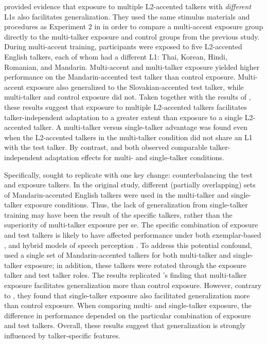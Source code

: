 \documentclass[preprint, 3p, authoryear]{elsarticle} %
\begin{document}
\citet{baese2013} provided evidence that exposure to multiple L2-accented talkers with \emph{different} L1s also facilitates generalization.
They used the same stimulus materials and procedures as Experiment 2 in \citet{bradlow2008} in order to compare a multi-accent exposure group directly to the multi-talker exposure and control groups from the previous study.
During multi-accent training, participants were exposed to five L2-accented English talkers, each of whom had a different L1: Thai, Korean, Hindi, Romanian, and Mandarin.
Multi-accent and multi-talker exposure yielded higher performance on the Mandarin-accented test talker than control exposure.
Multi-accent exposure also generalized to the Slovakian-accented test talker, while multi-talker and control exposure did not.
Taken together with the results of \citet{bradlow2008}, these results suggest that exposure to multiple L2-accented talkers facilitates talker-independent adaptation to a greater extent than exposure to a single L2-accented talker.
A multi-talker versus single-talker advantage was found even when the L2-accented talkers in the multi-talker condition did not share an L1 with the test talker.
By contrast, \citet{xie2021} and \citet{xie2017similarity} both observed comparable talker-independent adaptation effects for multi- and single-talker conditions.

Specifically, \citet{xie2021} sought to replicate \citet{bradlow2008} with one key change: counterbalancing the test and exposure talkers.
In the original study, different (partially overlapping) sets of Mandarin-accented English talkers were used in the multi-talker and single-talker exposure conditions.
Thus, the lack of generalization from single-talker training may have been the result of the specific talkers, rather than the superiority of multi-talker exposure per se.
The specific combination of exposure and test talkers is likely to have affected performance under both exemplar-based \citep[e.g.,][]{goldinger1998, johnson2006}, and hybrid \citep[e.g.,][]{pierrehumbert2016, kleinschmidt2015} models of speech perception \citep[see Introduction to][]{xie2021}.
To address this potential confound, \citet{xie2021} used a single set of Mandarin-accented talkers for both multi-talker and single-talker exposure; in addition, these talkers were rotated through the exposure talker and test talker roles.
The results replicated \citet{bradlow2008}'s finding that multi-talker exposure facilitates generalization more than control exposure.
However, contrary to \citet{bradlow2008}, they found that single-talker exposure also facilitated generalization more than control exposure.
When comparing multi- and single-talker exposure, the difference in performance depended on the particular combination of exposure and test talkers.
Overall, these results suggest that generalization is strongly influenced by talker-specific features.
\end{document}
